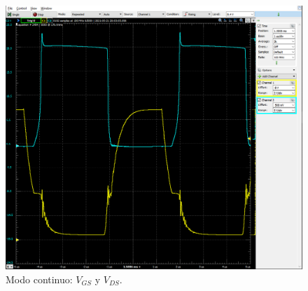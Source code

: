 \begin{figure}[H]
	\centering
	\includegraphics[width=\linewidth]{Imagenes/Continuo_VGS_VDS}
	\caption{Modo continuo: $V_{GS}$ y $V_{DS}$.}
	\label{fig:CONT_VGS_VDS}
\end{figure}

